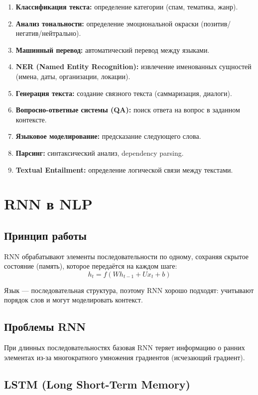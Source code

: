 \documentclass[a4paper,12pt]{article}
\begin{document}
\begin{enumerate}
    \item \textbf{Классификация текста:} определение категории (спам, тематика, жанр).
    \item \textbf{Анализ тональности:} определение эмоциональной окраски (позитив/негатив/нейтрально).
    \item \textbf{Машинный перевод:} автоматический перевод между языками.
    \item \textbf{NER (Named Entity Recognition):} извлечение именованных сущностей (имена, даты, организации, локации).
    \item \textbf{Генерация текста:} создание связного текста (саммаризация, диалоги).
    \item \textbf{Вопросно-ответные системы (QA):} поиск ответа на вопрос в заданном контексте.
    \item \textbf{Языковое моделирование:} предсказание следующего слова.
    \item \textbf{Парсинг:} синтаксический анализ, dependency parsing.
    \item \textbf{Textual Entailment:} определение логической связи между текстами.
\end{enumerate}

\section{RNN в NLP}

\subsection{Принцип работы}

RNN обрабатывают элементы последовательности по одному, сохраняя скрытое состояние (память), которое передаётся на каждом шаге:
\[
h_t = f(W h_{t-1} + U x_t + b)
\]

Язык — последовательная структура, поэтому RNN хорошо подходят: учитывают порядок слов и могут моделировать контекст.

\subsection{Проблемы RNN}

При длинных последовательностях базовая RNN теряет информацию о ранних элементах из-за многократного умножения градиентов (исчезающий градиент).

\subsection{LSTM (Long Short-Term Memory)}
\end{document}
